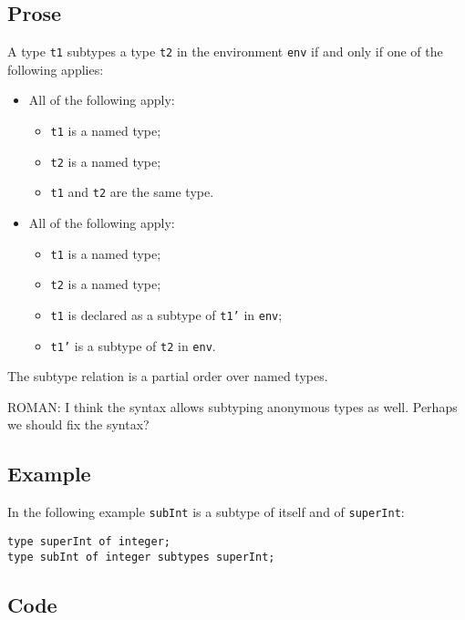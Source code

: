 \documentclass{book}
\begin{document}
  \subsection{Prose}
  A type \texttt{t1} subtypes a type \texttt{t2} in the environment
  \texttt{env} if and only if one of the following applies:
  \begin{itemize}
    \item All of the following apply:
      \begin{itemize}
        \item \texttt{t1} is a named type;
        \item \texttt{t2} is a named type;
        \item \texttt{t1} and \texttt{t2} are the same type.
      \end{itemize}
    \item All of the following apply:
      \begin{itemize}
        \item \texttt{t1} is a named type;
        \item \texttt{t2} is a named type;
        \item \texttt{t1} is declared as a subtype of \texttt{t1'} in \texttt{env};
        \item \texttt{t1'} is a subtype of \texttt{t2} in \texttt{env}.
      \end{itemize}
  \end{itemize}
The subtype relation is a partial order over named types.
\begin{emptytodo}
ROMAN: I think the syntax allows subtyping anonymous types as well. Perhaps we should fix the syntax?
\end{emptytodo}

  \subsection{Example}
In the following example \texttt{subInt} is a subtype of itself and of \texttt{superInt}:
\begin{verbatim}
type superInt of integer;
type subInt of integer subtypes superInt;
\end{verbatim}
 
  \subsection{Code}
\end{document}
